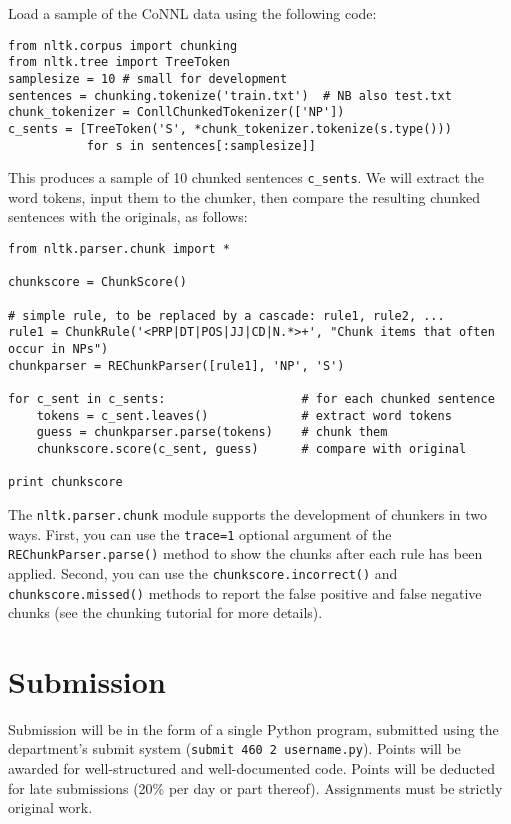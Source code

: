 \documentclass{460}
\begin{document}
Load a sample of the CoNNL data using the following code:

\begin{verbatim}
from nltk.corpus import chunking
from nltk.tree import TreeToken
samplesize = 10 # small for development
sentences = chunking.tokenize('train.txt')  # NB also test.txt
chunk_tokenizer = ConllChunkedTokenizer(['NP'])
c_sents = [TreeToken('S', *chunk_tokenizer.tokenize(s.type()))
           for s in sentences[:samplesize]]
\end{verbatim}

This produces a sample of 10 chunked sentences \texttt{c\_sents}.  We will
extract the word tokens, input them to the chunker, then compare the resulting
chunked sentences with the originals, as follows:

\begin{verbatim}
from nltk.parser.chunk import *

chunkscore = ChunkScore()

# simple rule, to be replaced by a cascade: rule1, rule2, ...
rule1 = ChunkRule('<PRP|DT|POS|JJ|CD|N.*>+', "Chunk items that often occur in NPs")
chunkparser = REChunkParser([rule1], 'NP', 'S')

for c_sent in c_sents:                   # for each chunked sentence
    tokens = c_sent.leaves()             # extract word tokens
    guess = chunkparser.parse(tokens)    # chunk them
    chunkscore.score(c_sent, guess)      # compare with original

print chunkscore
\end{verbatim}

The \texttt{nltk.parser.chunk} module supports the development of
chunkers in two ways.  First, you can use the \texttt{trace=1}
optional argument of the \texttt{REChunkParser.parse()} method to
show the chunks after each rule has been applied.  Second, you can use
the \texttt{chunkscore.incorrect()} and \texttt{chunkscore.missed()}
methods to report the false positive and false negative chunks
(see the chunking tutorial for more details).

\section*{Submission}

Submission will be in the form of a single Python program,
submitted using the department's submit system
(\texttt{submit 460 2 username.py}).
Points will be awarded for well-structured and
well-documented code.  Points will be deducted for late submissions
(20\% per day or part thereof).  Assignments must be strictly original
work.
\end{document}
